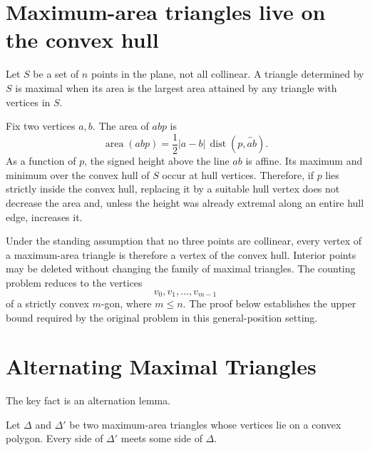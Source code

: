 
\section{Maximum-area triangles live on the convex hull}

Let \(S\) be a set of \(n\) points in the plane, not all collinear.  A triangle determined by \(S\) is maximal when its area is the largest area attained by any triangle with vertices in \(S\).

Fix two vertices \(a,b\).  The area of \(abp\) is
\[
  \operatorname{area}(abp)
  =\frac12|a-b|\,\operatorname{dist}(p,\overleftrightarrow{ab}).
\]
As a function of \(p\), the signed height above the line \(ab\) is affine.  Its maximum and minimum over the convex hull of \(S\) occur at hull vertices.  Therefore, if \(p\) lies strictly inside the convex hull, replacing it by a suitable hull vertex does not decrease the area and, unless the height was already extremal along an entire hull edge, increases it.

Under the standing assumption that no three points are collinear, every vertex of a maximum-area triangle is therefore a vertex of the convex hull.  Interior points may be deleted without changing the family of maximal triangles.  The counting problem reduces to the vertices
\[
  v_0,v_1,\ldots,v_{m-1}
\]
of a strictly convex \(m\)-gon, where \(m\le n\).  The proof below establishes the upper bound required by the original problem in this general-position setting.

\section{Alternating Maximal Triangles}

The key fact is an alternation lemma.

\begin{proposition}
Let \(\Delta\) and \(\Delta'\) be two maximum-area triangles whose vertices lie on a convex polygon.  Every side of \(\Delta'\) meets some side of \(\Delta\).
\end{proposition}

